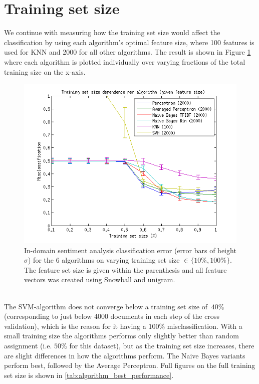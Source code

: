 \section{Training set size}
We continue with measuring how the training set size would affect the classification by using each algorithm's optimal feature size, where 100 features is used for KNN and 2000 for all other algorithms. The result is shown in Figure \ref{fig:trainingsize} where each algorithm is plotted individually over varying fractions of the total training size on the x-axis.\\
\begin{figure}[h!]
\centering
\includegraphics[width=1\linewidth]{../Plottar/training_size_k_2000allknn_100.png}
\caption{In-domain sentiment analysis classification error (error bars of height $\sigma$) for the 6 algorithms on varying training set size $\in \{10\%, 100\%\}$. The feature set size is given within the parenthesis and all feature vectors was created using Snowball and unigram.}
\label{fig:trainingsize}
\end{figure}\\
The SVM-algorithm does not converge below a training set size of $~40\%$ (corresponding to just below $4 000$ documents in each step of the cross validation), which is the reason for it having a $100\%$ misclassification. With a small training size the algorithms performs only slightly better than random assignment (i.e. $50\%$ for this dataset), but as the training set size increases, there are slight differences in how the algorithms perform. The Naive Bayes variants perform best, followed by the Average Perceptron. Full figures on the full training set size is shown in \ref{tab:algorithm_best_performance}.

